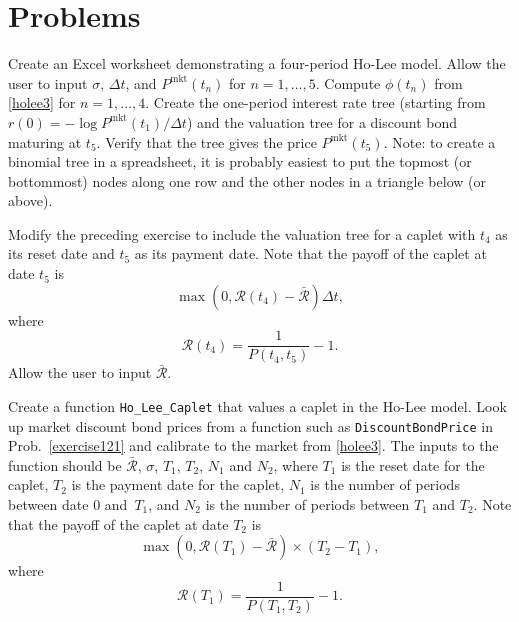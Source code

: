 
\section*{Problems}
\begin{prob}  Create an Excel worksheet demonstrating a four-period Ho-Lee model.  Allow the user to input $\sigma$, $\varDelta t$, and $P^{\text{mkt}}(t_n)$ for $n=1, \ldots, 5$.  Compute $\phi(t_n)$ from \eqref{holee3} for $n=1,\ldots, 4$.  Create the one-period interest rate tree (starting from $r(0) = -\log P^{\text{mkt}}(t_1)/\varDelta t$) and the valuation tree for a discount bond maturing at $t_5$.  Verify that the tree gives the price $P^{\text{mkt}}(t_5)$.  Note: to create a binomial tree in a spreadsheet, it is probably easiest to put the topmost (or bottommost) nodes along one row and the other nodes in a triangle below (or above).
\end{prob}\begin{prob} \label{e_holeecaplet}
Modify the preceding exercise to include the valuation tree for a caplet with $t_4$ as its reset date and $t_5$ as its payment date.  Note that the payoff of the caplet at date $t_5$ is
$$\max\left(0, \mathcal{R}(t_4)-\bar{\mathcal{R}}\right)\varDelta t,$$
where
$$\mathcal{R}(t_4) = \frac{1}{P(t_4,t_5)}-1.$$
Allow the user to input $\bar{\mathcal{R}}$.
\end{prob}\begin{prob}\label{e_holeecaplet2}
Create a function \verb!Ho_Lee_Caplet! that values a caplet in the Ho-Lee model.  Look up market discount bond prices from a function such as \verb!DiscountBondPrice! in Prob.~\ref{exercise121} and calibrate to the market from \eqref{holee3}.  The inputs to the function should be $\bar{\mathcal{R}}$, $\sigma$, $T_1$, $T_2$, $N_1$ and $N_2$, where $T_1$ is the reset date for the caplet, $T_2$ is the payment date for the caplet, $N_1$ is the number of periods between date 0 and~$T_1$, and $N_2$ is the number of periods between $T_1$ and $T_2$.  Note that the payoff of the caplet at date $T_2$ is
$$\max\left(0, \mathcal{R}(T_1)-\bar{\mathcal{R}}\right) \times (T_2-T_1),$$
where
$$\mathcal{R}(T_1) = \frac{1}{P(T_1,T_2)}-1.$$
\end{prob}
